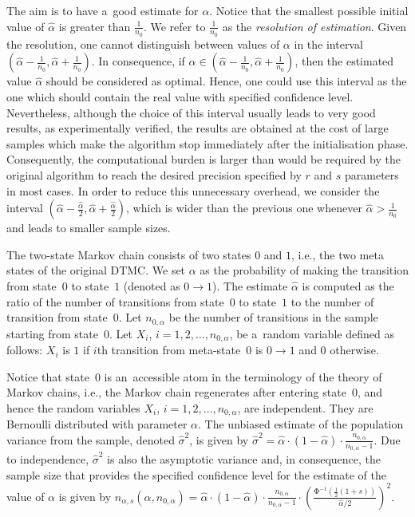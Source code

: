 \documentclass[runningheads,a4paper]{llncs}
\begin{document}
The aim is to have a~good estimate for $\alpha$. Notice that the smallest possible initial value
of $\hat{\alpha}$ is greater than $\frac{1}{n_0}$. We refer to $\frac{1}{n_0}$ as the
\emph{resolution of estimation}. Given the resolution, one cannot distinguish between values of
$\alpha$ in the interval $(\hat{\alpha}-\frac{1}{n_0},\hat{\alpha}+\frac{1}{n_0})$. In
consequence, if $\alpha \in (\hat{\alpha}-\frac{1}{n_0},\hat{\alpha}+\frac{1}{n_0})$, then the
estimated value $\hat{\alpha}$ should be considered as optimal. Hence, one could use this interval
as the one which should contain the real value with specified confidence level. Nevertheless,
although the choice of this interval usually leads to very good results, as experimentally
verified, the results are obtained at the cost of large samples which make the algorithm stop
immediately after the initialisation phase. Consequently, the computational burden is larger than
would be required by the original algorithm to reach the desired precision specified by $r$ and
$s$ parameters in most cases. In order to reduce this unnecessary overhead, we consider the
interval $(\hat{\alpha}-\frac{\hat{\alpha}}{2},\hat{\alpha}+\frac{\hat{\alpha}}{2})$, which is
wider than the previous one whenever $\hat{\alpha} > \frac{1}{n_0}$ and leads to smaller sample
sizes.

The two-state Markov chain consists of two states $0$ and $1$, i.e., the two meta states of the
original DTMC. We set $\alpha$ as the probability of making the transition from state~$0$ to
state~$1$ (denoted as $0 \rightarrow 1$).
The estimate $\hat{\alpha}$ is computed as  the ratio of the number of transitions from state~$0$
to state~$1$ to the number of transition from state~$0$. Let $n_{0,\alpha}$ be the number of
transitions in the sample starting from state~$0$. Let $X_i$, $i = 1,2,\ldots,n_{0,\alpha}$, be
a~random variable defined as follows: $X_i$ is $1$ if $i$th transition from meta-state~$0$ is
$0\rightarrow 1$ and $0$ otherwise.

Notice that state~$0$ is an~accessible atom in the terminology of the theory of Markov chains,
i.e., the Markov chain regenerates after entering state~$0$, and hence the random variables
$X_i$, $i = 1,2,\ldots,n_{0,\alpha}$, are independent. They are Bernoulli distributed with
parameter $\alpha$. The unbiased estimate of the population variance from the sample, denoted
$\hat{\sigma}^2$, is given by
$\hat{\sigma}^2 = \hat{\alpha}\cdot(1-\hat{\alpha})\cdot\frac{n_{0,\alpha}}{n_{0,\alpha}-1}$.
Due to independence, $\hat{\sigma}^2$ is also the asymptotic variance and, in consequence, the
sample size that provides the specified confidence level for the estimate of the value of $\alpha$
is given by
$n_{\alpha,s}(\hat{\alpha},n_{0,\alpha}) =
\hat{\alpha}\cdot(1-\hat{\alpha})\cdot\frac{n_{0,\alpha}}{n_{0,\alpha}-1}\cdot
     \left(\frac{\mathrm{\Phi}^{-1}(\frac{1}{2}(1+s))}{\hat{\alpha}/2}\right)^2$.
\end{document}
